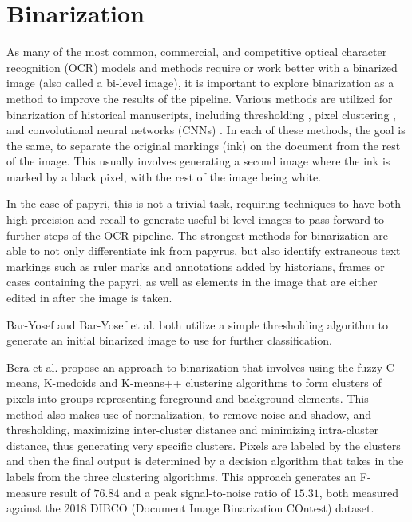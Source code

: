 \section{Binarization}
As many of the most common, commercial, and competitive optical character recognition (OCR) models and methods require or work better with a binarized image \cite{Gupta, SmithTesseract, SmithLines, Bar-Yosef2005, Bar-Yosef2007} (also called a bi-level image), it is important to explore binarization as a method to improve the results of the pipeline.
Various methods are utilized for binarization of historical manuscripts, including thresholding \cite{Bar-Yosef2005, Bar-Yosef2007}, pixel clustering \cite{Bera}, and convolutional neural networks (CNNs) \cite{Dhali2019, Dhali2020, Xiong}. In each of these methods, the goal is the same, to separate the original markings (ink) on the document from the rest of the image. This usually involves generating a second image where the ink is marked by a black pixel, with the rest of the image being white.

In the case of papyri, this is not a trivial task, requiring techniques to have both high precision and recall to generate useful bi-level images to pass forward to further steps of the OCR pipeline. The strongest methods for binarization are able to not only differentiate ink from papyrus, but also identify extraneous text markings such as ruler marks and annotations added by historians, frames or cases containing the papyri, as well as elements in the image that are either edited in after the image is taken.

Bar-Yosef \cite{Bar-Yosef2005} and Bar-Yosef et al.\cite{Bar-Yosef2005} both utilize a simple thresholding algorithm to generate an initial binarized image to use for further classification.

Bera et al.\cite{Bera} propose an approach to binarization that involves using the fuzzy C-means, K-medoids and K-means++ clustering algorithms to form clusters of pixels into groups representing foreground and background elements. This method also makes use of normalization, to remove noise and shadow, and thresholding, maximizing inter-cluster distance and minimizing intra-cluster distance, thus generating very specific clusters. Pixels are labeled by the clusters and then the final output is determined by a decision algorithm that takes in the labels from the three clustering algorithms. This approach generates an F-measure result of $76.84$ and a peak signal-to-noise ratio of $15.31$, both measured against the 2018 DIBCO (Document Image Binarization COntest) dataset\cite{DIBCO2018}.

